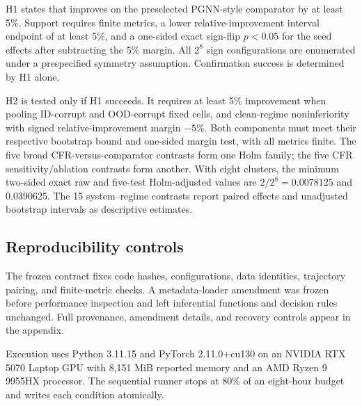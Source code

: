 H1 states that \method{} improves on the preselected PGNN-style comparator by at least 5\%.
Support requires finite metrics, a lower relative-improvement interval endpoint
of at least 5\%, and a one-sided exact sign-flip $p<0.05$ for the seed effects
after subtracting the 5\% margin. All $2^8$ sign configurations are enumerated
under a prespecified symmetry assumption. Confirmation success is determined
by H1 alone.

H2 is tested only if H1 succeeds. It requires at least 5\% improvement when
pooling ID-corrupt and OOD-corrupt fixed cells, and clean-regime
noninferiority with signed relative-improvement margin $-5\%$. Both components
must meet their respective bootstrap bound and one-sided margin test, with all
metrics finite. The five broad CFR-versus-comparator contrasts form one Holm
family; the five CFR sensitivity/ablation contrasts form another. With eight
clusters, the minimum two-sided exact raw and five-test Holm-adjusted values are
$2/2^8=0.0078125$ and 0.0390625. The 15 system--regime contrasts report paired
effects and unadjusted bootstrap intervals as descriptive estimates.

\subsection{Reproducibility controls}

The frozen contract fixes code hashes, configurations, data identities,
trajectory pairing, and finite-metric checks. A metadata-loader amendment was
frozen before performance inspection and left inferential functions and decision
rules unchanged. Full provenance, amendment details, and recovery controls
appear in the appendix.

Execution uses Python 3.11.15 and PyTorch 2.11.0+cu130 on an NVIDIA RTX 5070
Laptop GPU with 8,151 MiB reported memory and an AMD Ryzen 9 9955HX processor.
The sequential runner stops at 80\% of an eight-hour budget and writes each
condition atomically.
